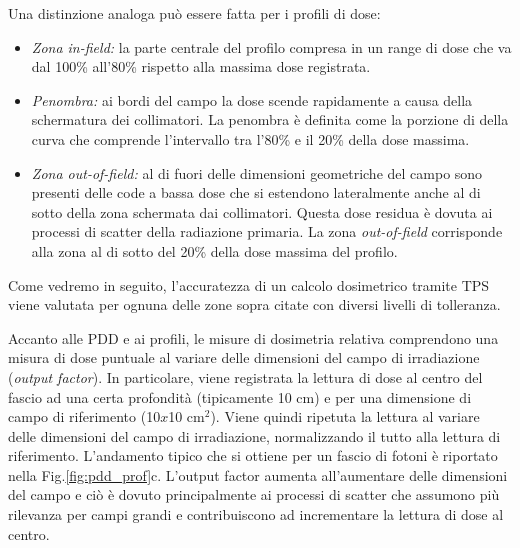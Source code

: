 Una distinzione analoga può essere fatta per i profili di dose:
\begin{itemize}
\item \textit{Zona in-field:} la parte centrale del profilo compresa in un range di dose che va dal 100\% all'80\% rispetto alla massima dose registrata.
\item \textit{Penombra:} ai bordi del campo la dose scende rapidamente a causa della schermatura dei collimatori. La penombra è definita come la porzione di della curva che comprende l'intervallo tra l'80\% e il 20\% della dose massima.
\item \textit{Zona out-of-field:} al di fuori delle dimensioni geometriche del campo sono presenti delle code a bassa dose che si estendono lateralmente anche al di sotto della zona schermata dai collimatori. Questa dose residua è dovuta ai processi di scatter della radiazione primaria. La zona \textit{out-of-field} corrisponde alla zona al di sotto del 20\% della dose massima del profilo.
\end{itemize}

Come vedremo in seguito, l'accuratezza di un calcolo dosimetrico tramite TPS viene valutata per ognuna delle zone sopra citate con diversi livelli di tolleranza. 

Accanto alle PDD e ai profili, le misure di dosimetria relativa comprendono una misura di dose puntuale al variare delle dimensioni del campo di irradiazione (\textit{output factor}). In particolare, viene registrata la lettura di dose al centro del fascio ad una certa profondità (tipicamente 10 cm) e per una dimensione di campo di riferimento (10$x$10 cm$^2$). Viene quindi ripetuta la lettura al variare delle dimensioni del campo di irradiazione, normalizzando il tutto alla lettura di riferimento. L'andamento tipico che si ottiene per un fascio di fotoni è riportato nella Fig.\ref{fig:pdd_prof}c. L'output factor aumenta all'aumentare delle dimensioni del campo e ciò è dovuto principalmente ai processi di scatter che assumono più rilevanza per campi grandi e contribuiscono ad incrementare la lettura di dose al centro.

